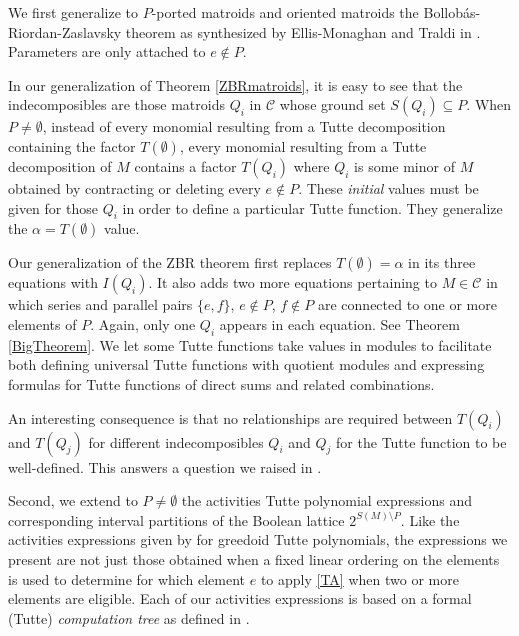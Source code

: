 \documentclass[12pt,leqno]{amsart}
\theoremstyle{remark}
\begin{document}
We first generalize to $P$-ported matroids and oriented matroids the 
Bollob\'{a}s-Riordan-Zaslavsky theorem as synthesized
by Ellis-Monaghan and Traldi in \cite{Ellis-Monaghan-Traldi}.  
Parameters are only attached to $e\not\in P$.

In our
generalization of Theorem \ref{ZBRmatroids}, it is easy to see that the 
indecomposibles are those matroids $Q_i$ in $\mathcal{C}$
whose ground set $S(Q_i)\subseteq P$.
When $P\neq\emptyset$,
instead of every monomial resulting from a Tutte decomposition
containing the factor $T(\emptyset)$, every monomial resulting 
from a Tutte decomposition of $M$ contains a factor $T(Q_i)$ where $Q_i$
is some minor of $M$ obtained by contracting or deleting every $e\not\in P$.
These 
\emph{initial} 
values must be given for those $Q_i$ in order
to define a particular Tutte function.  They generalize the
$\alpha=T(\emptyset)$ value.

Our generalization of the ZBR theorem 
first replaces $T(\emptyset)=\alpha$ in its three
equations with $I(Q_i)$.
It also adds two more equations pertaining to $M\in\mathcal{C}$
in which series and parallel pairs $\{e,f\}$, $e\not\in P$, $f\not\in P$
are connected to one or more elements of $P$.  Again, only
one $Q_i$ appears in each equation.  See Theorem \ref{BigTheorem}.
We let some Tutte functions take values in modules
to facilitate both defining universal Tutte functions with
quotient modules and
expressing formulas for Tutte functions of direct sums and
related combinations.

An interesting consequence is that no relationships are required
between $T(Q_i)$ and $T(Q_j)$ for different indecomposibles $Q_i$ and
$Q_j$ for the Tutte function to be well-defined.  This answers a 
question we raised in \cite{TutteEx}.

Second, we
extend to $P\ne \emptyset$ the activities Tutte polynomial
expressions and
corresponding interval partitions of the Boolean lattice
$2^{S(M)\setminus P}$.  Like the activities
expressions given by \cite{GordonMcMachonGreedoid}
for greedoid Tutte polynomials, the
expressions we present are not just those obtained when a fixed linear
ordering on the elements is used to determine for which element $e$ to
apply \eqref{TA} when two or more elements are eligible.
Each of our activities expressions is based on a formal (Tutte)
\emph{computation tree} as defined in \cite{GordonMcMachonGreedoid}.  
\end{document}
